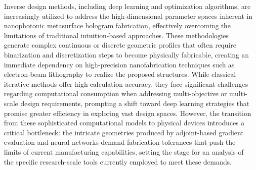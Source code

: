 Inverse design methods, including deep learning and optimization algorithms, are increasingly utilized to address the high-dimensional parameter spaces inherent in nanophotonic metasurface hologram fabrication, effectively overcoming the limitations of traditional intuition-based approaches. \citep{doi_10_1109_metamaterials54993_2022_9920895_1a67346a} These methodologies generate complex continuous or discrete geometric profiles that often require binarization and discretization steps to become physically fabricable, creating an immediate dependency on high-precision nanofabrication techniques such as electron-beam lithography to realize the proposed structures. While classical iterative methods offer high calculation accuracy, they face significant challenges regarding computational consumption when addressing multi-objective or multi-scale design requirements, prompting a shift toward deep learning strategies that promise greater efficiency in exploring vast design spaces. However, the transition from these sophisticated computational models to physical devices introduces a critical bottleneck: the intricate geometries produced by adjoint-based gradient evaluation and neural networks demand fabrication tolerances that push the limits of current manufacturing capabilities, setting the stage for an analysis of the specific research-scale tools currently employed to meet these demands. \citep{doi_10_1088_1361_6439_ad3a72_72d60f33} \citep{doi_10_48550_arxiv_2603_15210_fdcfb92f} \citep{doi_10_1109_metamaterials54993_2022_9920895_1a67346a}

